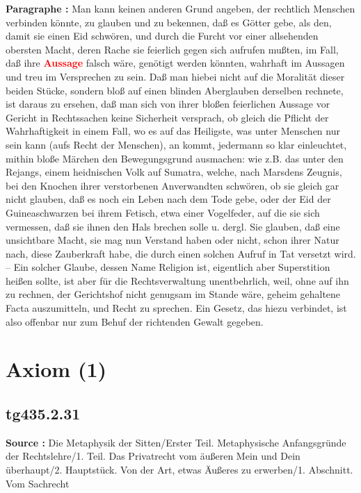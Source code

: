 \documentclass[a4paper,12pt,twoside]{book}
\newcommand{\match}[1]{\textcolor{red}{\textbf{#1}}}
\newcommand{\unnumberedsection}[1]{
	\section*{#1}
	\addcontentsline{toc}{section}{#1}
	\markright{#1}
}
\begin{document}
	\textbf{Paragraphe : }Man kann keinen anderen Grund angeben, der rechtlich Menschen verbinden könnte, zu glauben und zu bekennen, daß es Götter gebe, als den, damit sie einen Eid schwören, und durch die Furcht vor einer allsehenden obersten Macht, deren Rache sie feierlich gegen sich aufrufen mußten, im Fall, daß ihre \match{Aussage} falsch wäre, genötigt werden könnten, wahrhaft im Aussagen und treu im Versprechen zu sein. Daß man hiebei nicht auf die Moralität dieser beiden Stücke, sondern bloß auf einen blinden Aberglauben derselben rechnete, ist daraus zu ersehen, daß man sich von ihrer bloßen feierlichen Aussage vor Gericht in Rechtssachen keine Sicherheit versprach, ob gleich die Pflicht der Wahrhaftigkeit in einem Fall, wo es auf das Heiligste, was unter Menschen nur sein kann (aufs Recht der Menschen), an kommt, jedermann so klar einleuchtet, mithin bloße Märchen den Bewegungsgrund ausmachen: wie z.B. das unter den Rejangs, einem heidnischen Volk auf Sumatra, welche, nach Marsdens Zeugnis, bei den Knochen ihrer verstorbenen Anverwandten schwören, ob sie gleich gar nicht glauben, daß es noch ein Leben nach dem Tode gebe, oder der Eid der Guineaschwarzen bei ihrem Fetisch, etwa einer Vogelfeder, auf die sie sich vermessen, daß sie ihnen den Hals brechen solle u. dergl. Sie glauben, daß eine unsichtbare  Macht, sie mag nun Verstand haben oder nicht, schon ihrer Natur nach, diese Zauberkraft habe, die durch einen solchen Aufruf in Tat versetzt wird. – Ein solcher Glaube, dessen Name Religion ist, eigentlich aber Superstition heißen sollte, ist aber für die Rechtsverwaltung unentbehrlich, weil, ohne auf ihn zu rechnen, der Gerichtshof nicht genugsam im Stande wäre, geheim gehaltene Facta auszumitteln, und Recht zu sprechen. Ein Gesetz, das hiezu verbindet, ist also offenbar nur zum Behuf der richtenden Gewalt gegeben. 
	
	\unnumberedsection{Axiom (1)} 
	\subsection*{tg435.2.31} 
	\textbf{Source : }Die Metaphysik der Sitten/Erster Teil. Metaphysische Anfangsgründe der Rechtslehre/1. Teil. Das Privatrecht vom äußeren Mein und Dein überhaupt/2. Hauptstück. Von der Art, etwas Äußeres zu erwerben/1. Abschnitt. Vom Sachrecht\\  
	
\end{document}
